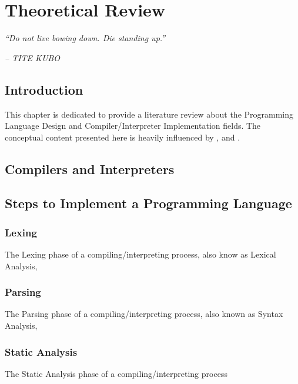 \chapter{Theoretical Review} \label{Cap:theoretical_review}

\begin{displayquote}
    \begin{center}
        \textit{``Do not live bowing down. Die standing up.''}
    \end{center}
\end{displayquote}

\begin{flushright}
   \textit{-- TITE KUBO}
\end{flushright}

\section{Introduction}
This chapter is dedicated to provide a literature review about the Programming Language Design and Compiler/Interpreter Implementation fields. The conceptual content presented here is heavily influenced by \cite{aho1986compilers}, \cite{cooper2022engineering} and \cite{nystrom2021crafting}.


\section{Compilers and Interpreters}

\section{Steps to Implement a Programming Language}

\subsection{Lexing}
The Lexing phase of a compiling/interpreting process, also know as Lexical Analysis, 

\subsection{Parsing}
The Parsing phase of a compiling/interpreting process, also known as Syntax Analysis,

\subsection{Static Analysis}
The Static Analysis phase of a compiling/interpreting process

